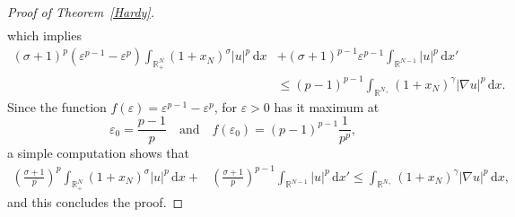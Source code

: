 \documentclass[12pt,reqno]{amsart}
\begin{document}
\begin{proof}[Proof of Theorem~\ref{Hardy}]
$$\begin{aligned}
   \end{aligned}
		$$
which implies 
  $$
  \begin{aligned}
			(\sigma+1)^p(\varepsilon^{p-1}-\varepsilon^p)\int_{\mathds{R}^N_+}(1+x_N)^{\sigma}|u|^p\, \mathrm{d} x&+(\sigma+1)^{p-1}\varepsilon^{p-1}	\int_{\mathds{R}^{N-1}}|u|^{p}\, \mathrm{d} x'\\
			&\leq (p-1)^{p-1}\int_{\mathds{R}^{N_+}}(1+x_N)^\gamma|\nabla u|^p \, \mathrm{d} x.
\end{aligned}
$$
		Since the function $f(\varepsilon)=\varepsilon^{p-1}-\varepsilon^p$, for $\varepsilon>0$ has it maximum at 
		$$
		\varepsilon_0=\frac{p-1}{p}\quad\mbox{and}\quad f(\varepsilon_0)=(p-1)^{p-1}\frac{1}{p^p},
		$$
		a simple computation shows that  
		\begin{align*}
			\left(\frac{\sigma+1}{p}\right)^p\int_{\mathds{R}^N_+}(1+x_N)^{\sigma}|u|^p\, \mathrm{d} x+&\left(\frac{\sigma+1}{p}\right)^{p-1}	\int_{\mathds{R}^{N-1}}|u|^{p}\, \mathrm{d} x'\leq \int_{\mathds{R}^{N_+}}(1+x_N)^\gamma|\nabla u|^p\, \mathrm{d} x,
		\end{align*}
		and this concludes the proof.
	\end{proof}
	
\end{document}
